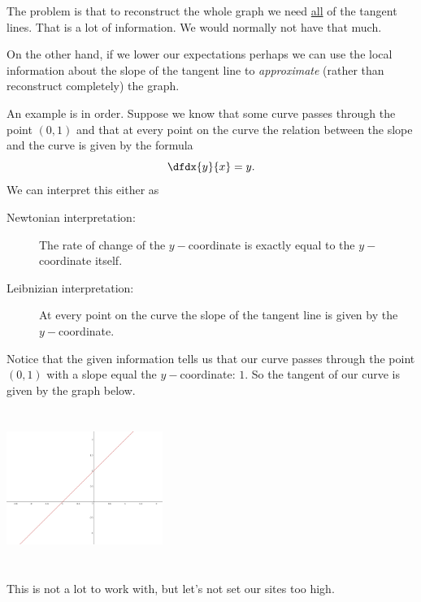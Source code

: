 The problem is that to reconstruct the whole graph we need
\underline{all} of the tangent lines. That is a lot of information.
We would normally not have that much. 

On the other hand, if we lower our expectations perhaps we can use the
local information about the slope of the tangent line to
\emph{approximate} (rather than reconstruct completely) the graph.


An example is in order. Suppose we know that some curve passes through
the point $(0,1)$ and that at every point on the curve the relation
between the slope and the curve is given by the formula
$$
\dfdx{y}{x} = y.
$$
We can interpret this either as 
\begin{description}
\item[Newtonian interpretation: ] The rate of change of the $y-$coordinate is
  exactly equal to the $y-$coordinate itself.
\item[Leibnizian interpretation:] At every point on
  the curve the slope of the tangent line is given by the
  $y-$coordinate.
\end{description}

Notice that the given information tells us that our curve passes
through the point $(0,1)$ with a slope equal the $y-$coordinate: $1.$
So the tangent of our curve is given by the graph below.\\
\centerline{\includegraphics*[height=2in,width=2in]{Figures/exp-envelope1}}
This is not a lot to work with, but let's not set our sites too
high. 

